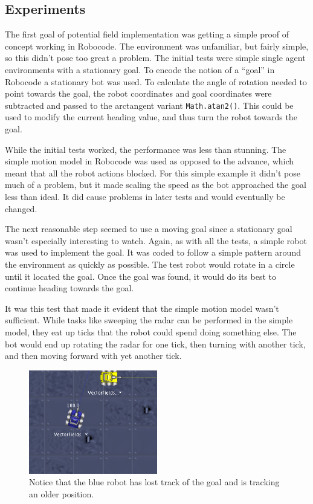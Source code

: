 \documentclass{aiaa-tc}%
\begin{document}
\subsection{Experiments}
The first goal of potential field implementation was getting a simple proof of concept working in Robocode. The environment was unfamiliar, but fairly simple, so this didn't pose too great a problem. The initial tests were simple single agent environments with a stationary goal. To encode the notion of a ``goal'' in Robocode a stationary bot was used. To calculate the angle of rotation needed to point towards the goal, the robot coordinates and goal coordinates were subtracted and passed to the arctangent variant \verb|Math.atan2()|. This could be used to modify the current heading value, and thus turn the robot towards the goal. 

While the initial tests worked, the performance was less than stunning. The simple motion model in Robocode was used as opposed to the advance, which meant that all the robot actions blocked. For this simple example it didn't pose much of a problem, but it made scaling the speed as the bot approached the goal less than ideal. It did cause problems in later tests and would eventually be changed.

The next reasonable step seemed to use a moving goal since a stationary goal wasn't especially interesting to watch. Again, as with all the tests, a simple robot was used to implement the goal. It was coded to follow a simple pattern around the environment as quickly as possible. The test robot would rotate in a circle until it located the goal. Once the goal was found, it would do its best to continue heading towards the goal. 

It was this test that made it evident that the simple motion model wasn't sufficient. While tasks like sweeping the radar can be performed in the simple model, they eat up ticks that the robot could spend doing something else. The bot would end up rotating the radar for one tick, then turning with another tick, and then moving forward with yet another tick. 

\begin{figure}[htb]
\centering
\includegraphics[width=0.5\textwidth]{images/SimpleRadarFailure}
\caption{Notice that the blue robot has lost track of the goal and is tracking an older position.}
\end{figure}
\end{document}
